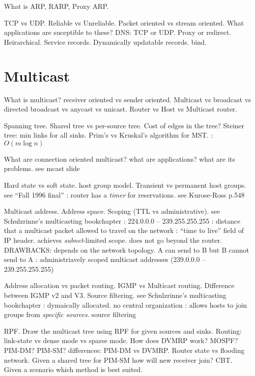 \documentclass{myart}
\begin{document}
\w What is ARP, RARP, Proxy ARP.

\w TCP vs UDP. Reliable vs Unreliable. Packet oriented vs stream
oriented.  What applications are suceptible to these? DNS: TCP or
UDP. Proxy or redirect.  Heirarchical. Service records. Dynamically
updatable records. bind.
\een

\section*{Multicast}
\ben
\w What is multicast? receiver oriented vs sender oriented. Multicast
vs broadcast vs directed broadcast vs anycast vs unicast. Router vs
Host vs Multicast router.
	\bit
	\w 
	\eit

\w Spanning tree. Shared tree vs per-source tree. Cost of edges in
the tree?  Steiner tree: min links for all sinks. Prim's vs Kruskal's
algorithm for MST.
	\bit
	\w {}: $O(m\log n)$
	\eit

\w What are connection oriented multicast? what are applications?
what are its problems.
	\bit
	\w see mcast slide
	\eit

\w Hard state vs soft state. host group model. Transient vs permanent
host groups.
	\bit
	\w see ``Fall 1996 final''
	\w {}: router has a {\em timer\/} for reservations.
		see Kurose-Ross p.548
	\eit

\w Multicast address. Address space. Scoping (TTL vs administrative).
	\bit
	\w see Schulzrinne's multicasting bookchapter
	\w {}: 224.0.0.0 -- 239.255.255.255
	\w {}: distance that a multicast packet allowed to
		travel on the network
		\bit
		\w {}: ``time to live'' field of IP header.
		achieves {\em subnet}-limited scope. does not go
		beyond the router. DRAWBACKS: depends on the network 
		topology. A can send to B but B cannot send to A
		\w {}:
		administriavely scoped multicast addresses 
		(239.0.0.0 -- 239.255.255.255)
		\eit
	\eit

\w Address allocation vs packet routing. IGMP vs Multicast
routing. Difference between IGMP v2 and V3. Source filtering.
	\bit
	\w see Schulzrinne's multicasting bookchapter
	\w {}: dymaically allocated.
		no central organization
	\w {}: allows hosts to join groups from {\em specific
		sources}. source filtering
	\eit

\w RPF. Draw the multicast tree using RPF for given sources and
sinks.  Routing: link-state vs dense mode vs sparse mode. How does
DVMRP work? MOSPF? PIM-DM? PIM-SM? differences: PIM-DM vs
DVMRP. Router state vs flooding network. Given a shared tree for
PIM-SM how will new receiver join? CBT. Given a scenario which method
is best suited.
\end{document}
